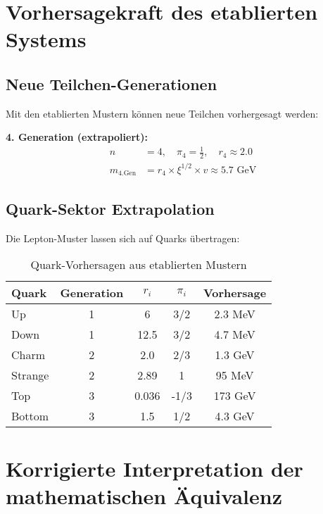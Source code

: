 \documentclass[12pt,a4paper]{article}
\begin{document}
	\section{Vorhersagekraft des etablierten Systems}
	\label{sec:vorhersagekraft}
	
	\subsection{Neue Teilchen-Generationen}
	\label{subsec:neue_generationen}
	
	Mit den etablierten Mustern können neue Teilchen vorhergesagt werden:
	
	\textbf{4. Generation (extrapoliert):}
	\begin{align}
		n &= 4, \quad \pi_4 = \frac{1}{2}, \quad r_4 \approx 2.0 \\
		m_{\text{4.Gen}} &= r_4 \times \xi^{1/2} \times v \approx 5.7 \text{ GeV}
	\end{align}
	
	\subsection{Quark-Sektor Extrapolation}
	\label{subsec:quark_extrapolation}
	
	Die Lepton-Muster lassen sich auf Quarks übertragen:
	
	\begin{table}[H]
		\centering
		\begin{tabular}{lcccc}
			\toprule
			\textbf{Quark} & \textbf{Generation} & \textbf{$r_i$} & \textbf{$\pi_i$} & \textbf{Vorhersage} \\
			\midrule
			Up & 1 & 6 & 3/2 & 2.3 MeV \\
			Down & 1 & 12.5 & 3/2 & 4.7 MeV \\
			Charm & 2 & 2.0 & 2/3 & 1.3 GeV \\
			Strange & 2 & 2.89 & 1 & 95 MeV \\
			Top & 3 & 0.036 & -1/3 & 173 GeV \\
			Bottom & 3 & 1.5 & 1/2 & 4.3 GeV \\
			\bottomrule
		\end{tabular}
		\caption{Quark-Vorhersagen aus etablierten Mustern}
		\label{tab:quark_vorhersagen}
	\end{table}
	
	\section{Korrigierte Interpretation der mathematischen Äquivalenz}
	\label{sec:korrigierte_interpretation}
	
\end{document}
